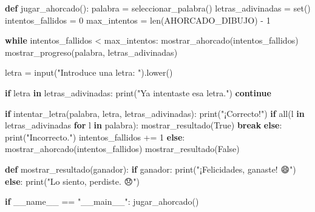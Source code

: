 \documentclass[
  a4paper,
  DIV=11,
  numbers=noendperiod,
  onepage,
  openany]{scrreprt}
\newenvironment{Shaded}{\begin{snugshade}}{\end{snugshade}}
\newcommand{\BuiltInTok}[1]{\textcolor[rgb]{0.00,0.23,0.31}{#1}}
\newcommand{\ControlFlowTok}[1]{\textcolor[rgb]{0.00,0.23,0.31}{\textbf{#1}}}
\newcommand{\DecValTok}[1]{\textcolor[rgb]{0.68,0.00,0.00}{#1}}
\newcommand{\KeywordTok}[1]{\textcolor[rgb]{0.00,0.23,0.31}{\textbf{#1}}}
\newcommand{\NormalTok}[1]{\textcolor[rgb]{0.00,0.23,0.31}{#1}}
\newcommand{\OperatorTok}[1]{\textcolor[rgb]{0.37,0.37,0.37}{#1}}
\newcommand{\StringTok}[1]{\textcolor[rgb]{0.13,0.47,0.30}{#1}}
\newcommand{\VariableTok}[1]{\textcolor[rgb]{0.07,0.07,0.07}{#1}}
\begin{document}
\begin{Shaded}
\begin{Highlighting}[]
\KeywordTok{def}\NormalTok{ jugar\_ahorcado():}
\NormalTok{    palabra }\OperatorTok{=}\NormalTok{ seleccionar\_palabra()}
\NormalTok{    letras\_adivinadas }\OperatorTok{=} \BuiltInTok{set}\NormalTok{()}
\NormalTok{    intentos\_fallidos }\OperatorTok{=} \DecValTok{0}
\NormalTok{    max\_intentos }\OperatorTok{=} \BuiltInTok{len}\NormalTok{(AHORCADO\_DIBUJO) }\OperatorTok{{-}} \DecValTok{1}

    \ControlFlowTok{while}\NormalTok{ intentos\_fallidos }\OperatorTok{\textless{}}\NormalTok{ max\_intentos:}
\NormalTok{        mostrar\_ahorcado(intentos\_fallidos)}
\NormalTok{        mostrar\_progreso(palabra, letras\_adivinadas)}
        
\NormalTok{        letra }\OperatorTok{=} \BuiltInTok{input}\NormalTok{(}\StringTok{"Introduce una letra: "}\NormalTok{).lower()}
        
        \ControlFlowTok{if}\NormalTok{ letra }\KeywordTok{in}\NormalTok{ letras\_adivinadas:}
            \BuiltInTok{print}\NormalTok{(}\StringTok{"Ya intentaste esa letra."}\NormalTok{)}
            \ControlFlowTok{continue}
        
        \ControlFlowTok{if}\NormalTok{ intentar\_letra(palabra, letra, letras\_adivinadas):}
            \BuiltInTok{print}\NormalTok{(}\StringTok{"¡Correcto!"}\NormalTok{)}
            \ControlFlowTok{if} \BuiltInTok{all}\NormalTok{(l }\KeywordTok{in}\NormalTok{ letras\_adivinadas }\ControlFlowTok{for}\NormalTok{ l }\KeywordTok{in}\NormalTok{ palabra):}
\NormalTok{                mostrar\_resultado(}\VariableTok{True}\NormalTok{)}
                \ControlFlowTok{break}
        \ControlFlowTok{else}\NormalTok{:}
            \BuiltInTok{print}\NormalTok{(}\StringTok{"Incorrecto."}\NormalTok{)}
\NormalTok{            intentos\_fallidos }\OperatorTok{+=} \DecValTok{1}
    \ControlFlowTok{else}\NormalTok{:}
\NormalTok{        mostrar\_ahorcado(intentos\_fallidos)}
\NormalTok{        mostrar\_resultado(}\VariableTok{False}\NormalTok{)}

\KeywordTok{def}\NormalTok{ mostrar\_resultado(ganador):}
    \ControlFlowTok{if}\NormalTok{ ganador:}
        \BuiltInTok{print}\NormalTok{(}\StringTok{"¡Felicidades, ganaste! 😄"}\NormalTok{)}
    \ControlFlowTok{else}\NormalTok{:}
        \BuiltInTok{print}\NormalTok{(}\StringTok{"Lo siento, perdiste. 😞"}\NormalTok{)}

\ControlFlowTok{if} \VariableTok{\_\_name\_\_} \OperatorTok{==} \StringTok{"\_\_main\_\_"}\NormalTok{:}
\NormalTok{    jugar\_ahorcado()}
\end{Highlighting}
\end{Shaded}
\end{document}
